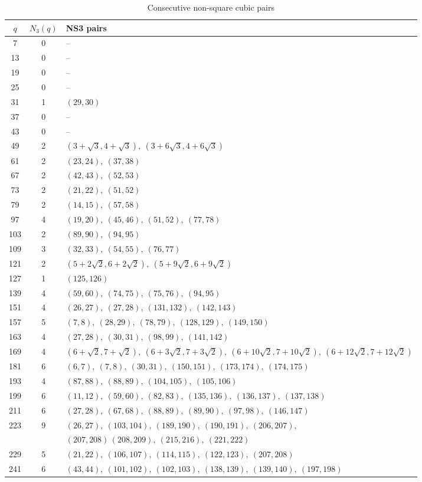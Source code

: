 \documentclass[12pt]{amsart}
\numberwithin{equation}{section}
\begin{document}
\bigskip


\begin{table}[H]
\centering
\renewcommand{\arraystretch}{1.15}
\caption{Consecutive non-square cubic pairs}
\label{N3qpairs}

\begin{tabular}{c c p{}}
\toprule
$q$ & $N_3(q)$ &  NS3 pairs \\
\midrule
7   & 0 & -- \\
13  & 0 & -- \\
19  & 0 & -- \\
25  & 0 & -- \\
31  & 1 & $(29,30)$ \\
37  & 0 & -- \\
43  & 0 & -- \\
49  & 2 & $(3+\sqrt3,4+\sqrt3),\ (3+6\sqrt3,4+6\sqrt3)$ \\
61  & 2 & $(23,24),\ (37,38)$ \\
67  & 2 & $(42,43),\ (52,53)$ \\
73  & 2 & $(21,22),\ (51,52)$ \\
79  & 2 & $(14,15),\ (57,58)$ \\
97  & 4 & $(19,20),\ (45,46),\ (51,52),\ (77,78)$ \\
103 & 2 & $(89,90),\ (94,95)$ \\
109 & 3 & $(32,33),\ (54,55),\ (76,77)$ \\
121 & 2 & $(5+2\sqrt2,6+2\sqrt2),\ (5+9\sqrt2,6+9\sqrt2)$ \\
127 & 1 & $(125,126)$ \\
139 & 4 & $(59,60),\ (74,75),\ (75,76),\ (94,95)$ \\
151 & 4 & $(26,27),\ (27,28),\ (131,132),\ (142,143)$ \\
157 & 5 & $(7,8),\ (28,29),\ (78,79),\ (128,129),\ (149,150)$ \\
163 & 4 & $(27,28),\ (30,31),\ (98,99),\ (141,142)$ \\
169 & 4 & $(6+\sqrt2,7+\sqrt2),\ (6+3\sqrt2,7+3\sqrt2),\ (6+10\sqrt2,7+10\sqrt2),\ (6+12\sqrt2,7+12\sqrt2)$ \\
181 & 6 & $(6,7),\ (7,8),\ (30,31),\ (150,151),\ (173,174),\ (174,175)$ \\
193 & 4 & $(87,88),\ (88,89),\ (104,105),\ (105,106)$ \\
199 & 6 & $(11,12),\ (59,60),\ (82,83),\ (135,136),\ (136,137),\ (137,138)$ \\
211 & 6 & $(27,28),\ (67,68),\ (88,89),\ (89,90),\ (97,98),\ (146,147)$ \\
223 & 9 & $(26,27),\ (103,104),\ (189,190),\ (190,191),\ (206,207),$\\ &&$(207,208)\, (208,209),\ (215,216),\ (221,222)$ \\
229 & 5 & $(21,22),\ (106,107),\ (114,115),\ (122,123),\ (207,208)$ \\
241 & 6 & $(43,44),\ (101,102),\ (102,103),\ (138,139),\ (139,140),\ (197,198)$ \\
\bottomrule
\end{tabular}
\end{table}
\end{document}

